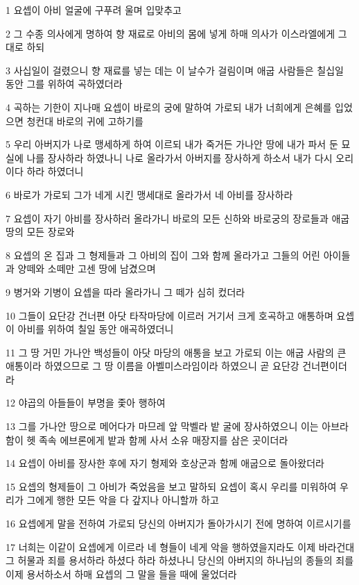 \par 1 요셉이 아비 얼굴에 구푸려 울며 입맞추고
\par 2 그 수종 의사에게 명하여 향 재료로 아비의 몸에 넣게 하매 의사가 이스라엘에게 그대로 하되
\par 3 사십일이 걸렸으니 향 재료를 넣는 데는 이 날수가 걸림이며 애굽 사람들은 칠십일 동안 그를 위하여 곡하였더라
\par 4 곡하는 기한이 지나매 요셉이 바로의 궁에 말하여 가로되 내가 너희에게 은혜를 입었으면 청컨대 바로의 귀에 고하기를
\par 5 우리 아버지가 나로 맹세하게 하여 이르되 내가 죽거든 가나안 땅에 내가 파서 둔 묘실에 나를 장사하라 하였나니 나로 올라가서 아버지를 장사하게 하소서 내가 다시 오리이다 하라 하였더니
\par 6 바로가 가로되 그가 네게 시킨 맹세대로 올라가서 네 아비를 장사하라
\par 7 요셉이 자기 아비를 장사하러 올라가니 바로의 모든 신하와 바로궁의 장로들과 애굽 땅의 모든 장로와
\par 8 요셉의 온 집과 그 형제들과 그 아비의 집이 그와 함께 올라가고 그들의 어린 아이들과 양떼와 소떼만 고센 땅에 남겼으며
\par 9 병거와 기병이 요셉을 따라 올라가니 그 떼가 심히 컸더라
\par 10 그들이 요단강 건너편 아닷 타작마당에 이르러 거기서 크게 호곡하고 애통하며 요셉이 아비를 위하여 칠일 동안 애곡하였더니
\par 11 그 땅 거민 가나안 백성들이 아닷 마당의 애통을 보고 가로되 이는 애굽 사람의 큰 애통이라 하였으므로 그 땅 이름을 아벨미스라임이라 하였으니 곧 요단강 건너편이더라
\par 12 야곱의 아들들이 부명을 좇아 행하여
\par 13 그를 가나안 땅으로 메어다가 마므레 앞 막벨라 밭 굴에 장사하였으니 이는 아브라함이 헷 족속 에브론에게 밭과 함께 사서 소유 매장지를 삼은 곳이더라
\par 14 요셉이 아비를 장사한 후에 자기 형제와 호상군과 함께 애굽으로 돌아왔더라
\par 15 요셉의 형제들이 그 아비가 죽었음을 보고 말하되 요셉이 혹시 우리를 미워하여 우리가 그에게 행한 모든 악을 다 갚지나 아니할까 하고
\par 16 요셉에게 말을 전하여 가로되 당신의 아버지가 돌아가시기 전에 명하여 이르시기를
\par 17 너희는 이같이 요셉에게 이르라 네 형들이 네게 악을 행하였을지라도 이제 바라건대 그 허물과 죄를 용서하라 하셨다 하라 하셨나니 당신의 아버지의 하나님의 종들의 죄를 이제 용서하소서 하매 요셉의 그 말을 들을 때에 울었더라
